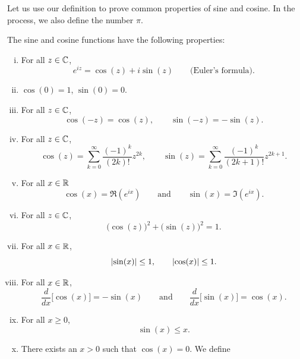 Let us use our definition to prove common properties of
sine and cosine.  In the process, we also define the
number $\pi$.

\begin{prop}
The sine and cosine functions have the following properties:
\begin{enumerate}[(i)]
\item For all $z \in {\mathbb{C}}$,
\begin{equation*}
e^{iz} = \cos(z) + i\sin(z) \qquad
\text{(Euler's formula)}.
\end{equation*}
\item $\cos(0) = 1$, $\sin(0) = 0$.
\item For all $z \in {\mathbb{C}}$,
\begin{equation*}
\cos(-z) = \cos(z), \qquad
\sin(-z) = -\sin(z).
\end{equation*}
\item For all $z \in {\mathbb{C}}$,
\begin{equation*}
\cos(z) = \sum_{k=0}^\infty \frac{{(-1)}^k}{(2k)!} z^{2k} ,
\qquad
\sin(z) = \sum_{k=0}^\infty \frac{{(-1)}^k}{(2k+1)!} z^{2k+1} .
\end{equation*}
\item For all $x \in {\mathbb{R}}$
\begin{equation*}
\cos(x) = \Re (e^{ix})
\qquad\text{and}\qquad
\sin(x) = \Im (e^{ix}) .
\end{equation*}
\item For all $z \in {\mathbb{C}}$,
\begin{equation*}
{\bigl( \cos(z) \bigr)}^2 + {\bigl( \sin(z) \bigr)}^2 = 1 .
\end{equation*}
\item For all $x \in {\mathbb{R}}$,
\begin{equation*}
\lvert {\sin(x)} \rvert \leq 1, \qquad \lvert {\cos(x)} \rvert \leq 1 .
\end{equation*}
\item For all $x \in {\mathbb{R}}$,
\begin{equation*}
\frac{d}{dx} \bigl[ \cos(x) \bigr] = -\sin(x)
\qquad \text{and} \qquad
\frac{d}{dx} \bigl[ \sin(x) \bigr] = \cos(x) .
\end{equation*}
\item For all $x \geq 0$,
\begin{equation*}
\sin(x) \leq x .
\end{equation*}
\item
There exists an $x > 0$ such that $\cos(x) = 0$.  We define
\begin{equation*}

\end{equation*}
\end{enumerate}
\end{prop}
